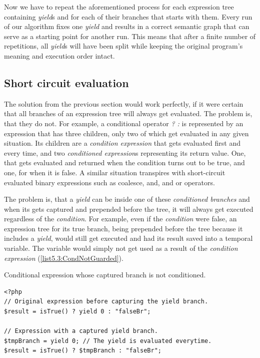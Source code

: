 Now we have to repeat the aforementioned process for each expression tree containing \emph{yield}s and for each of their branches that starts with them. Every run of our algorithm fixes one \emph{yield} and results in a correct semantic graph that can serve as a starting point for another run. This means that after a finite number of repetitions, all \emph{yield}s will have been split while keeping the original program’s meaning and execution order intact.

\subsection{Short circuit evaluation}

The solution from the previous section would work perfectly, if it were certain that all branches of an expression tree will always get evaluated. The problem is, that they do not. For example, a conditional operator \emph{? :} is represented by an expression that has three children, only two of which get evaluated in any given situation. Its children are a \emph{condition expression} that gets evaluated first and every time, and two \emph{conditioned expression}s representing its return value. One, that gets evaluated and returned when the condition turns out to be true, and one, for when it is false. A similar situation transpires with short-circuit evaluated binary expressions such as coalesce, and, and or operators.

The problem is, that a \emph{yield} can be inside one of these \emph{conditioned branches} and when its gets captured and prepended before the tree, it will always get executed regardless of the \emph{condition}. For example, even if the \emph{condition} were false, an expression tree for its true branch, being prepended before the tree because it includes a \emph{yield}, would still get executed and had its result saved into a temporal variable. The variable would simply not get used as a result of the \emph{condition expression} (\autoref{list5.3:CondNotGuarded}).

\begin{listing}[H]
\caption{Conditional expression whose captured branch is not conditioned.}
\label{list5.3:CondNotGuarded}
\begin{verbatim}
<?php
// Original expression before capturing the yield branch.
$result = isTrue() ? yield 0 : "falseBr";

// Expression with a captured yield branch.
$tmpBranch = yield 0; // The yield is evaluated everytime.
$result = isTrue() ? $tmpBranch : "falseBr";
\end{verbatim}
\end{listing}


